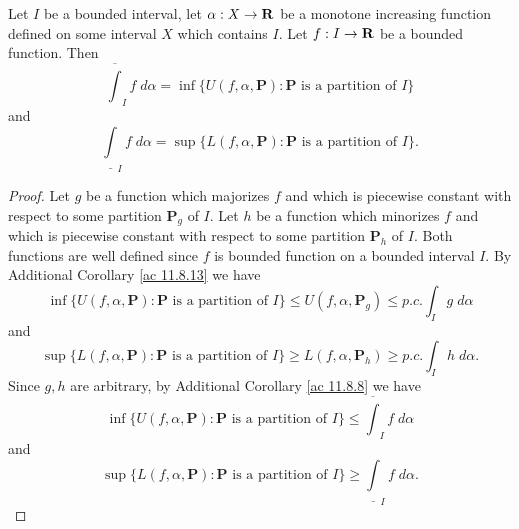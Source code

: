 \begin{additional corollary}\label{ac 11.8.14}
Let \(I\) be a bounded interval, let \(\alpha : X \to \mathbf{R}\) be a monotone increasing function defined on some interval \(X\) which contains \(I\).
Let \(f : I \to \mathbf{R}\) be a bounded function.
Then
\[
    \overline{\int}_I f \; d \alpha = \inf\{U(f, \alpha, \mathbf{P}) : \mathbf{P} \text{ is a partition of } I\}
\]
and
\[
    \underline{\int}_I f \; d \alpha = \sup\{L(f, \alpha, \mathbf{P}) : \mathbf{P} \text{ is a partition of } I\}.
\]
\end{additional corollary}

\begin{proof}
    Let \(g\) be a function which majorizes \(f\) and which is piecewise constant with respect to some partition \(\mathbf{P}_g\) of \(I\).
    Let \(h\) be a function which minorizes \(f\) and which is piecewise constant with respect to some partition \(\mathbf{P}_h\) of \(I\).
    Both functions are well defined since \(f\) is bounded function on a bounded interval \(I\).
    By Additional Corollary \ref{ac 11.8.13} we have
    \[
        \inf\big\{U(f, \alpha, \mathbf{P}) : \mathbf{P} \text{ is a partition of } I\big\} \leq U(f, \alpha, \mathbf{P}_g) \leq p.c. \int_I g \; d \alpha
    \]
    and
    \[
        \sup\big\{L(f, \alpha, \mathbf{P}) : \mathbf{P} \text{ is a partition of } I\big\} \geq L(f, \alpha, \mathbf{P}_h) \geq p.c. \int_I h \; d \alpha.
    \]
    Since \(g, h\) are arbitrary, by Additional Corollary \ref{ac 11.8.8} we have
    \[
        \inf\big\{U(f, \alpha, \mathbf{P}) : \mathbf{P} \text{ is a partition of } I\big\} \leq \overline{\int}_I f \; d \alpha
    \]
    and
    \[
        \sup\big\{L(f, \alpha, \mathbf{P}) : \mathbf{P} \text{ is a partition of } I\big\} \geq \underline{\int}_I f \; d \alpha.
    \]


\end{proof}
